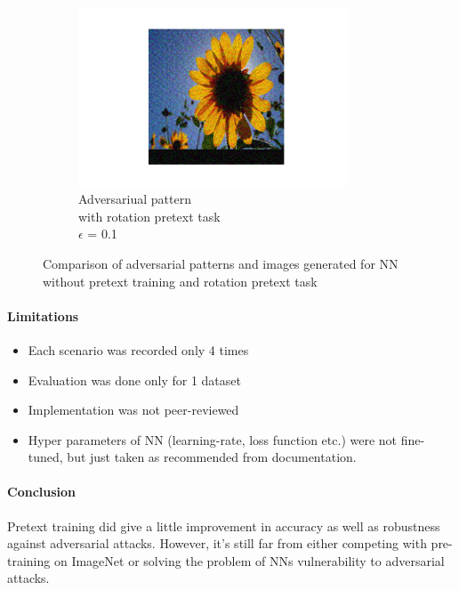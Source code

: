 \begin{figure}[h]
\begin{subfigure}{0.4\textwidth}
    \end{subfigure}
    \begin{subfigure}{0.4\textwidth}
        \caption{Adversariual pattern \\ with rotation pretext task \\ $\epsilon$ = 0.1}
        \centering
        \includegraphics[width=8cm]{images/pr_sunflower_adv_attack_01}
    \end{subfigure}
    \caption{Comparison of adversarial patterns and images generated for NN without pretext training and rotation pretext task}
\end{figure}

\paragraph{Limitations}
\begin{itemize}
    \item Each scenario was recorded only 4 times
    \item Evaluation was done only for 1 dataset
    \item Implementation was not peer-reviewed
    \item Hyper parameters of NN (learning-rate, loss function etc.) were not fine-tuned,
    but just taken as recommended from documentation.
\end{itemize}

\paragraph{Conclusion}
Pretext training did give a little improvement in accuracy as well as robustness against adversarial attacks.
However, it's still far from either competing with pre-training on ImageNet or solving the problem of NNs vulnerability
to adversarial attacks.

